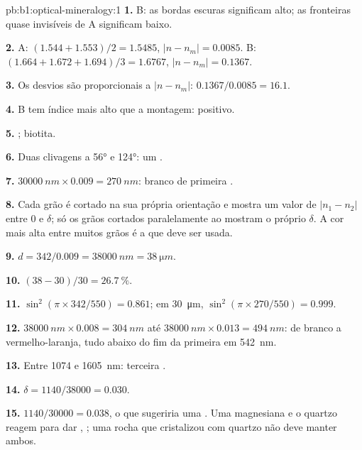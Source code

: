 \begin{solution}{pb:b1:optical-mineralogy:1}
\textbf{1.} B: as bordas escuras significam  alto; as fronteiras quase invisíveis de A significam  baixo.

\textbf{2.} A: $(1.544 + 1.553)/2 = 1.5485$, $|n - n_m| = 0.0085$. B:
$(1.664 + 1.672 + 1.694)/3 = 1.6767$, $|n - n_m| = 0.1367$.

\textbf{3.} Os desvios são proporcionais a $|n - n_m|$: $0.1367/0.0085 =
16.1$.

\textbf{4.} B tem índice mais alto que a montagem:  positivo.

\textbf{5.} ; biotita.

\textbf{6.} Duas clivagens a \ang{56} e \ang{124}: um .

\textbf{7.} $\qty{30000}{nm}\times0.009 = \qty{270}{nm}$: branco de primeira .

\textbf{8.} Cada grão é cortado na sua própria orientação e mostra um valor de
$|n_1 - n_2|$ entre 0 e $\delta$; só os grãos cortados paralelamente ao  mostram o próprio $\delta$. A cor mais alta entre muitos grãos é a que deve ser usada.

\textbf{9.} $d = 342/0.009 = \qty{38000}{nm} = \qty{38}{\micro m}$.

\textbf{10.} $(38 - 30)/30 = \qty{26.7}{\percent}$.

\textbf{11.} $\sin^2(\pi\times342/550) = 0.861$; em \qty{30}{\micro m},
$\sin^2(\pi\times270/550) = 0.999$.

\textbf{12.} $\qty{38000}{nm}\times0.008 = \qty{304}{nm}$ até
$\qty{38000}{nm}\times0.013 = \qty{494}{nm}$: de branco a vermelho-laranja, tudo abaixo
do fim da primeira  em \qty{542}{nm}.

\textbf{13.} Entre 1074 e \qty{1605}{nm}: terceira .

\textbf{14.} $\delta = 1140/38000 = 0.030$.

\textbf{15.} $1140/30000 = 0.038$, o que sugeriria uma . Uma  magnesiana e o quartzo reagem para dar ,
; uma rocha que cristalizou com quartzo não deve manter ambos.


\end{solution}
